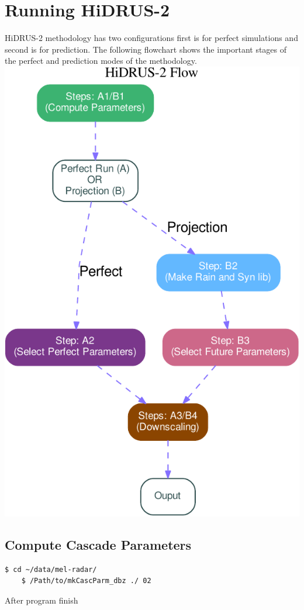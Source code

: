 \documentclass[12pt, a4paper]{extarticle}
\begin{document}
\section{Running HiDRUS-2}
HiDRUS-2 methodology has two configurations first is for perfect simulations and second is for prediction.
The following flowchart shows the important stages of the perfect and prediction modes of the methodology.
\includegraphics[width=6in]{./fig/flow.pdf}

\subsection{Compute Cascade Parameters}
\begin{lstlisting}[style=BashInputStyle]
	$ cd ~/data/mel-radar/
	$ /Path/to/mkCascParm_dbz ./ 02
\end{lstlisting}
 After program finish 
 
\end{document}
